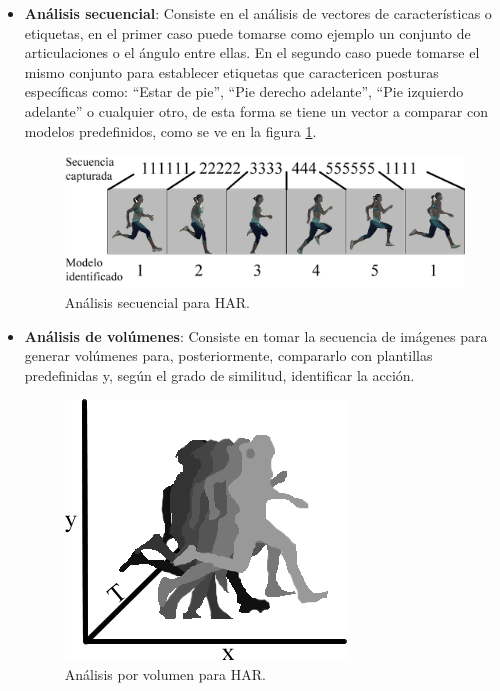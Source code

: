             \begin{itemize}
                
                \item \textbf{Análisis secuencial}: Consiste en el análisis de vectores de características o etiquetas, en el primer caso puede tomarse como ejemplo un conjunto de articulaciones o el ángulo entre ellas. En el segundo caso puede tomarse el mismo conjunto para establecer etiquetas que caractericen posturas específicas como: ``Estar de pie'', ``Pie derecho adelante'', ``Pie izquierdo adelante'' o cualquier otro, de esta forma se tiene un vector a comparar con modelos predefinidos, como se ve en la  figura \ref{fig:HARSequentialModel}.
        
                \begin{figure}[ht!]
                	\centering
                	\includegraphics[width=0.9\linewidth]{imgs/02-Referential/02-HARSequentialModel.png}
                	\caption[Análisis secuencial para HAR]{Análisis secuencial para HAR.}
            	    \label{fig:HARSequentialModel}
                \end{figure}%
                
                \item \textbf{Análisis de volúmenes}: Consiste en tomar la secuencia de imágenes para generar volúmenes para, posteriormente, compararlo con plantillas predefinidas y, según el grado de similitud, identificar la acción.
                
                \begin{figure}[ht!]
                	\centering
                	\includegraphics[width=0.5\linewidth]{imgs/02-Referential/02-HARVolumenModel.png}
                	\caption[Análisis por volumen para HAR]{Análisis por volumen para HAR.}
            	    \label{fig:HARVolumenModel}
                \end{figure}%
                

\end{itemize}
